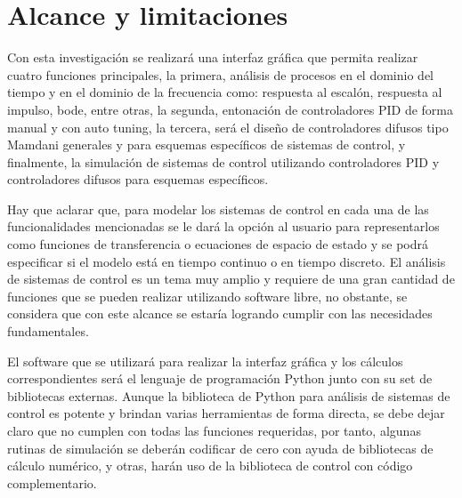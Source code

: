 \section{Alcance y limitaciones}

	Con esta investigación se realizará una interfaz gráfica que permita realizar cuatro funciones principales, la primera, análisis de procesos en el dominio del tiempo y en el dominio de la frecuencia como: respuesta al escalón, respuesta al impulso, bode, entre otras, la segunda, entonación de controladores PID de forma manual y con auto tuning, la tercera, será el diseño de controladores difusos tipo Mamdani generales y para esquemas específicos de sistemas de control, y finalmente, la simulación de sistemas de control utilizando controladores PID y controladores difusos para esquemas específicos.

	Hay que aclarar que, para modelar los sistemas de control en cada una de las funcionalidades mencionadas se le dará la opción al usuario para representarlos como funciones de transferencia o ecuaciones de espacio de estado y se podrá especificar si el modelo está en tiempo continuo o en tiempo discreto. El análisis de sistemas de control es un tema muy amplio y requiere de una gran cantidad de funciones que se pueden realizar utilizando software libre, no obstante, se considera que con este alcance se estaría logrando cumplir con las necesidades fundamentales. 

	El software que se utilizará para realizar la interfaz gráfica y los cálculos correspondientes será el lenguaje de programación Python junto con su set de bibliotecas externas. Aunque la biblioteca de Python para análisis de sistemas de control es potente y brindan varias herramientas de forma directa, se debe dejar claro que no cumplen con todas las funciones requeridas, por tanto, algunas rutinas de simulación se deberán codificar de cero con ayuda de bibliotecas de cálculo numérico, y otras, harán uso de la biblioteca de control con código complementario.
